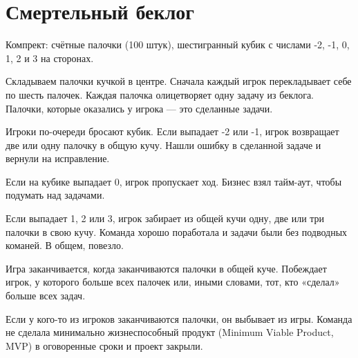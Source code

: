 



\section*{Смертельный беклог}

Компрект: счётные палочки (100 штук), шестигранный кубик с числами -2, -1, 0, 1, 2 и 3 на сторонах.

Складываем палочки кучкой в центре.
Сначала каждый игрок перекладывает себе по шесть палочек.
Каждая палочка олицетворяет одну задачу из беклога. Палочки, которые оказались у игрока — это сделанные задачи.

Игроки по-очереди бросают кубик.
Если выпадает -2 или -1, игрок возвращает две или одну палочку в общую кучу.
Нашли ошибку в сделанной задаче и вернули на исправление.

Если на кубике выпадает 0, игрок пропускает ход.
Бизнес взял тайм-аут, чтобы подумать над задачами.

Если выпадает 1, 2 или 3, игрок забирает из общей кучи одну, две или три палочки в свою кучу.
Команда хорошо поработала и задачи были без подводных команей.
В общем, повезло.

Игра заканчивается, когда заканчиваются палочки в общей куче.
Побеждает игрок, у которого больше всех палочек или, иными словами, тот, кто «сделал» больше всех задач.

Если у кого-то из игроков заканчиваются палочки, он выбывает из игры.
Команда не сделала минимально жизнеспособный продукт (Minimum Viable Product, MVP) в оговоренные сроки и проект закрыли.


